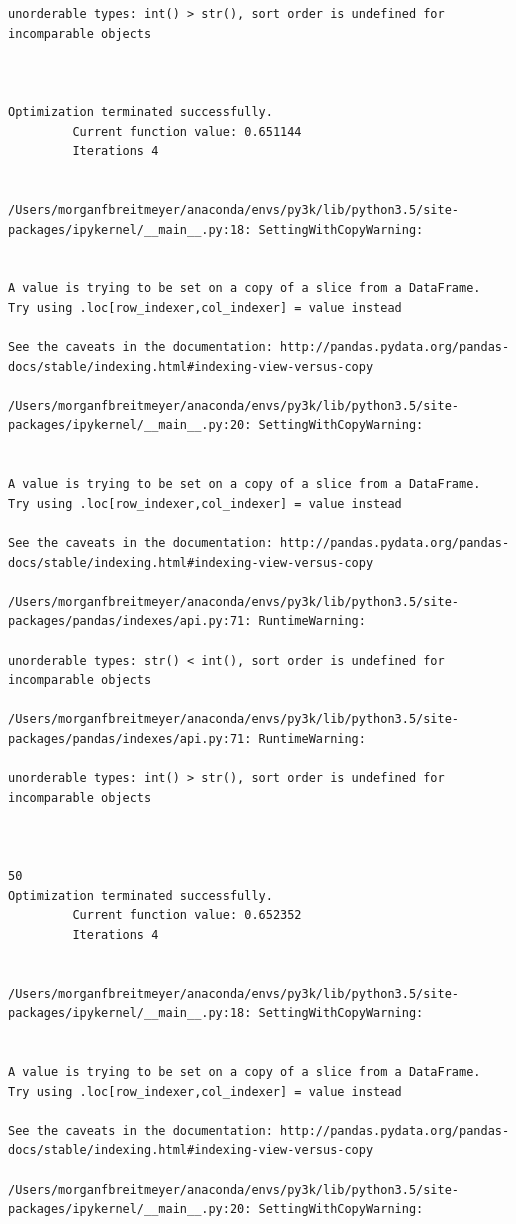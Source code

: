 \begin{lstlisting}
unorderable types: int() > str(), sort order is undefined for incomparable objects



Optimization terminated successfully.
         Current function value: 0.651144
         Iterations 4


/Users/morganfbreitmeyer/anaconda/envs/py3k/lib/python3.5/site-packages/ipykernel/__main__.py:18: SettingWithCopyWarning:


A value is trying to be set on a copy of a slice from a DataFrame.
Try using .loc[row_indexer,col_indexer] = value instead

See the caveats in the documentation: http://pandas.pydata.org/pandas-docs/stable/indexing.html#indexing-view-versus-copy

/Users/morganfbreitmeyer/anaconda/envs/py3k/lib/python3.5/site-packages/ipykernel/__main__.py:20: SettingWithCopyWarning:


A value is trying to be set on a copy of a slice from a DataFrame.
Try using .loc[row_indexer,col_indexer] = value instead

See the caveats in the documentation: http://pandas.pydata.org/pandas-docs/stable/indexing.html#indexing-view-versus-copy

/Users/morganfbreitmeyer/anaconda/envs/py3k/lib/python3.5/site-packages/pandas/indexes/api.py:71: RuntimeWarning:

unorderable types: str() < int(), sort order is undefined for incomparable objects

/Users/morganfbreitmeyer/anaconda/envs/py3k/lib/python3.5/site-packages/pandas/indexes/api.py:71: RuntimeWarning:

unorderable types: int() > str(), sort order is undefined for incomparable objects



50
Optimization terminated successfully.
         Current function value: 0.652352
         Iterations 4


/Users/morganfbreitmeyer/anaconda/envs/py3k/lib/python3.5/site-packages/ipykernel/__main__.py:18: SettingWithCopyWarning:


A value is trying to be set on a copy of a slice from a DataFrame.
Try using .loc[row_indexer,col_indexer] = value instead

See the caveats in the documentation: http://pandas.pydata.org/pandas-docs/stable/indexing.html#indexing-view-versus-copy

/Users/morganfbreitmeyer/anaconda/envs/py3k/lib/python3.5/site-packages/ipykernel/__main__.py:20: SettingWithCopyWarning:



\end{lstlisting}
